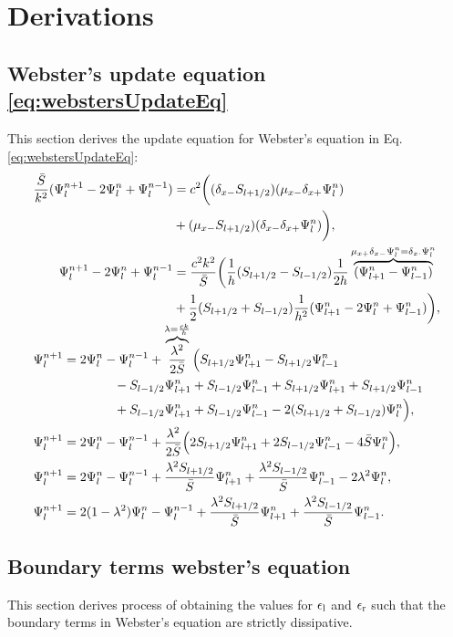 \chapter{Derivations}\label{app:derivations}
\def\Psilp{\Psi_{l+1}^n}
\def\Psilm{\Psi_{l-1}^n}
\def\Psinp{\Psi_l^{n+1}}
\def\Psinm{\Psi_l^{n-1}}

\section{Webster's update equation \eqref{eq:webstersUpdateEq}}\label{app:webstersUpdateEq}
This section derives the update equation for Webster's equation in Eq. \eqref{eq:webstersUpdateEq}:
\begin{align*}
    &\begin{aligned}
    \frac{\Sbar}{k^2}(\Psi_l^{n+1} - 2\Psiln+\Psi_l^{n-1}) &= c^2\bigg((\dxm \Sp)(\mxm \dxp \Psiln)\\
    & + (\mxm \Sp)(\dxm \dxp \Psiln)\bigg),\\
    \Psinp - 2\Psiln+\Psinm &= \frac{c^2k^2}{\Sbar}\bigg(\frac{1}{h}(\Sp - \Sm)\frac{1}{2h}\overbrace{(\Psilp -\Psilm)}^{\mxp\dxm\Psiln = \delta_{x\cdot}\Psiln}\nonumber\\
    &+\frac{1}{2}(\Sp + \Sm)\frac{1}{h^2}(\Psilp-2\Psiln+\Psilm)\bigg),
    \end{aligned}\\[-0.5em]
    &\begin{aligned}
        \Psinp &= 2\Psiln -\Psinm +\overbrace{\frac{\lambda^2}{2\Sbar}}^{\lambda = \frac{ck}{h}}\Big(\Sp\Psilp - \Sp\Psilm\\
        &\qquad\qquad - \Sm\Psilp + \Sm\Psilm+ \Sp\Psilp + \Sp\Psilm \\
        &\qquad\qquad + \Sm\Psilp + \Sm\Psilm - 2 (\Sp + \Sm)\Psiln\Big)\nonumber,\\
        \Psinp &= 2\Psiln-\Psinm+ \frac{\lambda^2}{2\Sbar}\Big(2\Sp\Psilp + 2\Sm\Psilm - 4\Sbar\Psiln\Big)\nonumber,\\
        \Psinp &= 2\Psiln-\Psinm+ \frac{\lambda^2\Sp}{\Sbar}\Psilp + \frac{\lambda^2\Sm}{\Sbar}\Psilm - 2\lambda^2\Psiln\nonumber,\\
        \Psinp &= 2(1-\lambda^2)\Psiln-\Psinm+ \frac{\lambda^2\Sp}{\Sbar}\Psilp + \frac{\lambda^2\Sm}{\Sbar}\Psilm.
    \end{aligned}
\end{align*}

\section{Boundary terms webster's equation}\label{app:boundaryWebster}
This section derives process of obtaining the values for $\epsilon_\text{l}$ and $\epsilon_\text{r}$ such that the boundary terms in Webster's equation are strictly dissipative. 

